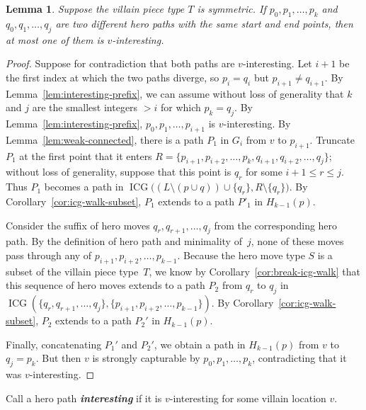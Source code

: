 \documentclass[11pt,letterpaper]{article}
\def\defn#1{\textbf{\textit{\boldmath #1}}}
\newcommand{\ICG}{\operatorname{ICG}}
\theoremstyle{plain}
\newtheorem{lemma}[theorem]{Lemma}
\theoremstyle{definition}
\theoremstyle{remark}
\numberwithin{equation}{section}
\begin{document}
\begin{lemma}
  \label{lem:no-interesting-cycle}
  Suppose the villain piece type \(T\) is symmetric.
  If $p_0, p_1, \ldots, p_k$ and $q_0, q_1, \ldots, q_j$
  are two different hero paths with the same start and end points,
  then at most one of them is $v$-interesting.
\end{lemma}
\begin{proof}
  Suppose for contradiction that both paths are $v$-interesting.
  Let $i+1$ be the first index at which the two paths diverge, so $p_i = q_i$ but $p_{i+1} \ne q_{i+1}$.
  By Lemma~\ref{lem:interesting-prefix},
  we can assume without loss of generality that \(k\) and \(j\) are the
  smallest integers $> i$ for which $p_k = q_j$.
  By Lemma~\ref{lem:interesting-prefix},
  \(p_0, p_1, \ldots, p_{i+1}\) is \(v\)-interesting.
  By Lemma~\ref{lem:weak-connected},
  there is a path \(P_1\) in \(G_i\) from \(v\) to \(p_{i+1}\).
  Truncate \(P_1\) at the first point that it enters
  \(R = \{p_{i+1}, p_{i+2}, \ldots, p_k, q_{i+1}, q_{i+2}, \ldots, q_j\}\);
  without loss of generality, suppose that this point is \(q_r\)
  for some \(i + 1 \le r \le j\).
  Thus \(P_1\) becomes a path in \(\ICG\big((L \setminus (p \cup q)) \cup \{q_r\}, R \setminus \{q_r\}\big)\).
  By Corollary~\ref{cor:icg-walk-subset}, \(P_1\) extends to a path \(P'_1\) in \(H_{k-1}(p)\).

  Consider the suffix of hero moves \(q_r, q_{r+1}, \ldots, q_j\)
  from the corresponding hero path.
  By the definition of hero path and minimality of~\(j\),
  none of these moves pass through any of \(p_{i+1}, p_{i+2}, \ldots, p_{k-1}\).
  Because the hero move type \(S\) is a subset of the villain piece type~\(T\),
  we know by Corollary~\ref{cor:break-icg-walk} that
  this sequence of hero moves extends to a path \(P_2\) from \(q_r\) to \(q_j\)
  in \(\ICG(\{q_r, q_{r+1}, \ldots, q_j\}, \{p_{i+1}, p_{i+2}, \ldots, p_{k-1}\})\).
  By Corollary~\ref{cor:icg-walk-subset}, \(P_2\) extends to a path \(P_2'\) in \(H_{k-1}(p)\).

  Finally, concatenating \(P_1'\) and \(P_2'\),
  we obtain a path in \(H_{k-1}(p)\) from \(v\) to \(q_j = p_k\).
  But then \(v\) is strongly capturable by \(p_0, p_1, \ldots, p_k\),
  contradicting that it was \(v\)-interesting.
\end{proof}

Call a hero path \defn{interesting} if it is \(v\)-interesting
for some villain location \(v\).
\end{document}
